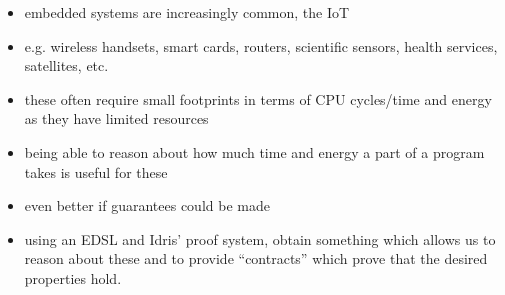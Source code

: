 \begin{itemize}
	\item embedded systems are increasingly common, the IoT
	\item e.g. wireless handsets, smart cards, routers, scientific sensors,
		  health services, satellites, etc.
	\item these often require small footprints in terms of CPU cycles/time and
		  energy as they have limited resources
	\item being able to reason about how much time and energy a part of a
		  program takes is useful for these
	\item even better if guarantees could be made
	\item using an EDSL and Idris' proof system, obtain something which allows
		  us to reason about these and to provide ``contracts'' which prove that
		  the desired properties hold.
\end{itemize}
